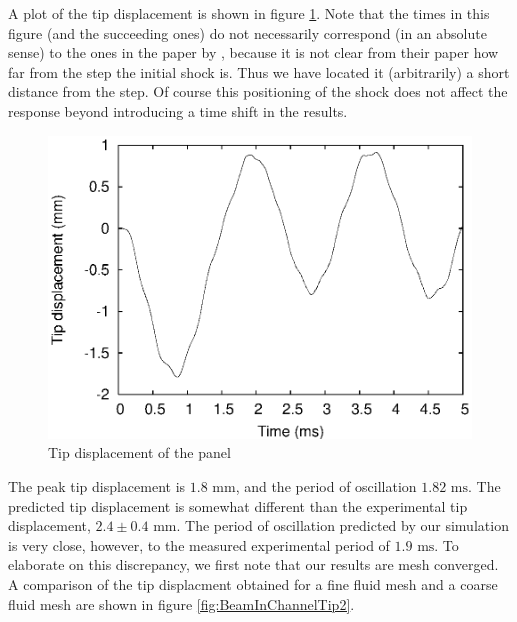 \documentclass{article}
\begin{document}
A plot of the tip displacement is shown in figure \ref{fig:BeamInChannelTip1}.
Note that the times in this figure (and the succeeding ones) do not necessarily correspond (in an absolute sense) to the ones in the paper by \cite{Giordano2005}, because it is not clear from their paper how far from the step the initial shock is. 
Thus we have located it (arbitrarily) a short distance from the step.  
Of course this positioning of the shock does not affect the response beyond introducing a time shift in the results.
\begin{figure}[ht]
        \centering
        \includegraphics[width=\textwidth]{beam_in_channel} 
        \caption{Tip displacement of the panel}
        \label{fig:BeamInChannelTip1}
\end{figure}
The peak tip displacement is $1.8 \mbox{ mm}$, and the period of oscillation $1.82 \mbox{ ms}$.  
The predicted tip displacement is somewhat different than the experimental tip displacement, $2.4 \pm 0.4 \mbox{ mm}$. 
The period of oscillation predicted by our simulation is very close, however, to the measured experimental period of $1.9 \mbox{ ms}$.
To elaborate on this discrepancy, we first note that our results are mesh converged. 
A comparison of the tip displacment obtained for a fine fluid mesh and a coarse fluid mesh are shown in figure \ref{fig:BeamInChannelTip2}.
\end{document}
